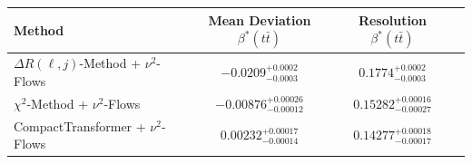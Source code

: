     \begin{tabular}{lccc}
        \toprule
        Method & Mean Deviation $\beta^*(t\bar{t})$ & Resolution $\beta^*(t\bar{t})$ \\
        \midrule
        $\Delta R(\ell,j)$-Method + $\nu^2$-Flows & $-0.0209^{+0.0002}_{-0.0003}$ & $0.1774^{+0.0002}_{-0.0003}$ \\
        $\chi^2$-Method + $\nu^2$-Flows & $-0.00876^{+0.00026}_{-0.00012}$ & $0.15282^{+0.00016}_{-0.00027}$ \\
        CompactTransformer + $\nu^2$-Flows & $0.00232^{+0.00017}_{-0.00014}$ & $0.14277^{+0.00018}_{-0.00017}$ \\
        \bottomrule
    \end{tabular}